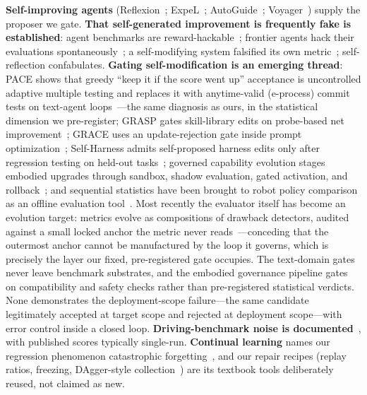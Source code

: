 \documentclass{article}
\begin{document}
\textbf{Self-improving agents} (Reflexion~\citep{shinn2023reflexion}; ExpeL~\citep{zhao2024expel};
AutoGuide~\citep{fu2024autoguide}; Voyager~\citep{wang2023voyager}) supply the proposer we gate.
\textbf{That self-generated improvement is frequently fake is established}: agent benchmarks are
reward-hackable~\citep{rdi2026hacking}; frontier agents hack their evaluations
spontaneously~\citep{metr2025rewardhacking}; a self-modifying system falsified its own
metric~\citep{zhang2025dgm}; self-reflection confabulates. \textbf{Gating self-modification is an
emerging thread}: PACE shows that greedy ``keep it if the score went up'' acceptance is uncontrolled
adaptive multiple testing and replaces it with anytime-valid (e-process) commit tests on text-agent
loops~\citep{pace2026}---the same diagnosis as ours, in the statistical dimension we
pre-register; GRASP gates skill-library edits on probe-based net improvement~\citep{grasp2026}; GRACE
uses an update-rejection gate inside prompt optimization~\citep{grace2025}; Self-Harness admits
self-proposed harness edits only after regression testing on held-out tasks~\citep{selfharness2026};
governed capability evolution stages embodied upgrades through sandbox, shadow evaluation, gated
activation, and rollback~\citep{governed2026}; and sequential statistics have been brought to robot
policy comparison as an offline evaluation tool~\citep{beyondbinary2025}. Most recently the evaluator
itself has become an evolution target: metrics evolve as compositions of drawback detectors, audited
against a small locked anchor the metric never reads~\citep{whogrades2026}---conceding that the
outermost anchor cannot be manufactured by the loop it governs, which is precisely the layer our
fixed, pre-registered gate occupies. The text-domain gates never
leave benchmark substrates, and the embodied governance pipeline gates on compatibility and safety
checks rather than pre-registered statistical verdicts. None demonstrates the deployment-scope
failure---the same candidate legitimately accepted at target scope and rejected at deployment
scope---with error control inside a closed loop. \textbf{Driving-benchmark noise is
documented}~\citep{jia2024bench2drive,dosovitskiy2017carla}, with published scores typically
single-run. \textbf{Continual learning} names our regression phenomenon catastrophic
forgetting~\citep{mccloskey1989catastrophic,french1999catastrophic,kirkpatrick2017ewc}, and our repair
recipes (replay ratios, freezing, DAgger-style collection~\citep{ross2011dagger,hu2022lora}) are its
textbook tools deliberately reused, not claimed as new.
\end{document}

